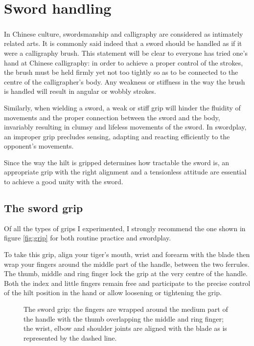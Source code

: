 \chapter{Sword handling}\label{ch:grip}

\paragraph*{}
In Chinese culture, swordsmanship and calligraphy are considered as intimately related arts.
It is commonly said indeed that a sword should be handled as if it were a calligraphy brush.
This statement will be clear to everyone has tried one's hand at Chinese calligraphy: in order to achieve a proper control of the strokes, the brush must be held firmly yet not too tightly so as to be connected to the centre of the calligrapher's body.
Any weakness or stiffness in the way the brush is handled will result in angular or wobbly strokes.

Similarly, when wielding a sword, a weak or stiff grip will hinder the fluidity of movements and the proper connection between the sword and the body, invariably resulting in clumsy and lifeless movements of the sword.
In swordplay, an improper grip precludes sensing, adapting and reacting efficiently to the opponent's movements. 

Since the way the hilt is gripped determines how tractable the sword is, an appropriate grip with the right alignment and a tensionless attitude are essential to achieve a good unity with the sword.

\section{The sword grip} 
Of all the types of grips I experimented, I strongly recommend the one shown in figure \ref{fig:grip} for both routine practice and swordplay.

To take this grip, align your tiger's mouth, wrist and forearm with the blade then wrap your fingers around the middle part of the handle, between the two ferrules.
The thumb, middle and ring finger lock the grip at the very centre of the handle.
Both the index and little fingers remain free and participate to the precise control of the hilt position in the hand or allow loosening or tightening the grip.

\begin{figure}[ht]
	\centering
	\caption[The sword grip]{The sword grip:  the fingers are wrapped around the medium part of the handle with the thumb overlapping the middle and ring finger;
	 the wrist, elbow and shoulder joints are aligned with the blade as is represented by the dashed line.}
\end{figure}

